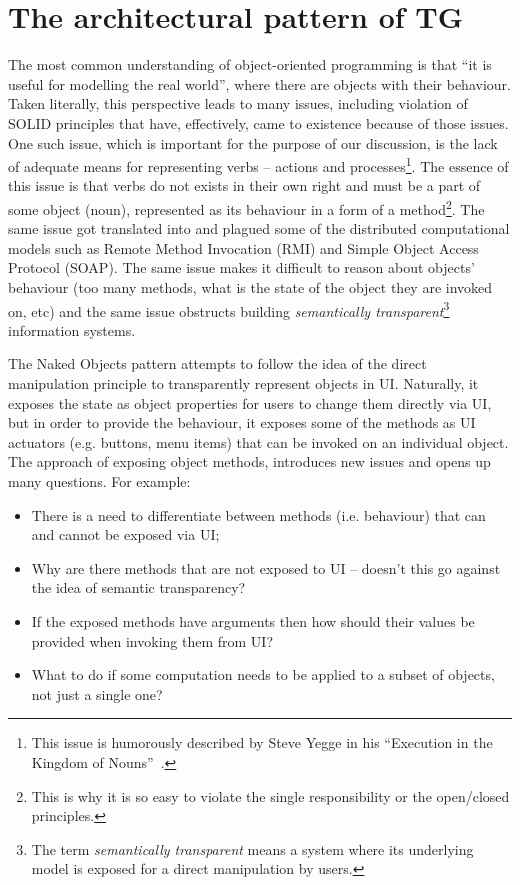\documentclass[a4paper,12pt,oneside,openright,final]{memoir} %
\begin{document}
\section*{The architectural pattern of TG}
	The most common understanding of object-oriented programming is that ``it is useful for modelling the real world'', where there are objects with their behaviour.
	Taken literally, this perspective leads to many issues, including violation of SOLID principles that have, effectively, came to existence because of those issues.
	One such issue, which is important for the purpose of our discussion, is the lack of adequate means for representing verbs -- actions and processes\footnote{This issue is humorously  described by Steve Yegge in his ``Execution in the Kingdom of Nouns''~\cite{yegge2006}.}.
	The essence of this issue is that verbs do not exists in their own right and must be a part of some object (noun), represented as its behaviour in a form of a method\footnote{This is why it is so easy to violate the single responsibility or the open/closed principles.}.
	The same issue got translated into and plagued some of the distributed computational models such as Remote Method Invocation (RMI) and Simple Object Access Protocol (SOAP).
	The same issue makes it difficult to reason about objects' behaviour (too many methods, what is the state of the object they are invoked on, etc) and the same issue obstructs building \emph{semantically transparent}\footnote{The term \emph{semantically transparent} means a system where its underlying model is exposed for a direct manipulation by users.} information systems.
	
	The Naked Objects pattern attempts to follow the idea of the direct manipulation principle to transparently represent objects in UI.
	Naturally, it exposes the state as object properties for users to change them directly via UI, but in order to provide the behaviour, it exposes some of the methods as UI actuators (e.g. buttons, menu items) that can be invoked on an individual object.
	The approach of exposing object methods, introduces new issues and opens up many questions.
	For example:
  	\begin{itemize}
    	\item There is a need to differentiate between methods (i.e. behaviour) that can and cannot be exposed via UI;
		\item Why are there methods that are not exposed to UI -- doesn't this go against the idea of semantic transparency?
		\item If the exposed methods have arguments then how should their values be provided when invoking them from UI?
		\item What to do if some computation needs to be applied to a subset of objects, not just a single one?
	\end{itemize}
	
\end{document}
